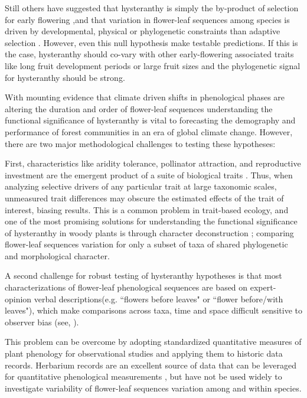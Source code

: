\documentclass{article}\usepackage[]{graphicx}\usepackage[]{color}
\begin{document}
\noindent Still others have suggested that hysteranthy is simply the by-product of selection for early flowering \citep{},and that variation in flower-leaf sequences among species is driven by developmental, physical or phylogenetic constraints than adaptive selection \citep{}. However, even this null hypothesis make testable predictions. If this is the case, hysteranthy should co-vary with other early-flowering associated traits like long fruit development periods or large fruit sizes \citep{} and the phylogenetic signal for hysteranthy should be strong.

\noindent With mounting evidence that climate driven shifts in phenological phases are altering the duration and order of flower-leaf sequences \citep{} understanding the functional significance of hysteranthy is vital to forecasting the demography and performance of forest communities in an era of global climate change. However, there are two major methodological challenges to testing these hypotheses:

\noindent First, characteristics like aridity tolerance, pollinator attraction, and reproductive investment are the emergent product of a suite of biological traits \citep{}. Thus, when analyzing selective drivers of any particular trait at large taxonomic scales, unmeasured trait differences may obscure the estimated effects of the trait of interest, biasing results. %
This is a common problem in trait-based ecology, and one of the most promising solutions for understanding the functional significance of hysteranthy in woody plants is through character deconstruction \citep{}; comparing flower-leaf sequences variation for only a subset of taxa of shared phylogenetic and morphological character.   

\noindent A second challenge for robust testing of hysteranthy hypotheses is that most characterizations of flower-leaf phenological sequences are based on expert-opinion verbal descriptions(e.g. ``flowers before leaves" or ``flower before/with leaves"), which make comparisons across taxa, time and space difficult sensitive to observer bias (see, \citep{}). 

\noindent This problem can be overcome by adopting standardized quantitative measures of plant phenology for observational studies and applying them to historic data records. Herbarium records are an excellent source of data that can be leveraged for quantitative phenological measurements \citep{}, but have not be used widely to investigate variability of flower-leaf sequences variation among and within species.
\end{document}
